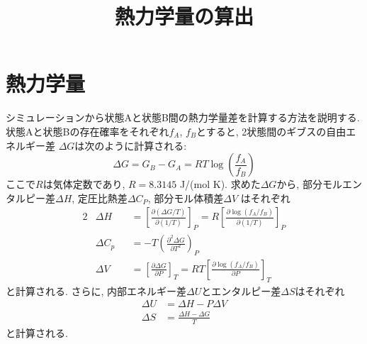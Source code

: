 





\title{熱力学量の算出}
\maketitle

\section{熱力学量}
シミュレーションから状態Aと状態B間の熱力学量差を計算する方法を説明する. 
状態Aと状態Bの存在確率をそれぞれ$f_{A}$, $f_{B}$とすると, 
2状態間のギブスの自由エネルギー差 $\Delta G$は次のように計算される:
\begin{equation}
    \Delta G = G_{B} - G_{A} =
    RT \log \left( \frac{f_{A}}{f_{B}} \right)
    \label{Eq:DeltaG}
\end{equation}
ここで$R$は気体定数であり, $R=8.3145$ J/(mol K). 
求めた$\Delta G$から, 
部分モルエンタルピー差$\Delta H$, 定圧比熱差$\Delta C_{P}$, 部分モル体積差$\Delta V$
はそれぞれ
\begin{alignat}{2}
    &\Delta H &&=
    \left[\frac{\partial \left(\Delta G / T\right)}{\partial \left( 1/T \right)}\right]_{P} =
    R \left[\frac{\partial \log (f_{A}/f_{B})} {\partial(1/T)} \right]_{P}
    \label{Eq:DeltaH} \\
    &\Delta C_{p} &&=
    - T \left(\frac{\partial^{2} \Delta G}{\partial T^{2}}\right)_{P}
    \label{Eq:DeltaCp} \\
    &\Delta V &&=
    \left[\frac{\partial \Delta G}{\partial P}\right]_{T} =
    RT \left[\frac{\partial \log (f_{A}/f_{B})}{\partial P} \right]_{T}
  \label{Eq:DeltaV}
\end{alignat}
と計算される. 
さらに, 内部エネルギー差$\Delta U$とエンタルピー差$\Delta S$はそれぞれ
\begin{align}
    \Delta U &= \Delta H - P \Delta V
    \label{Eq:DeltaU} \\
    \Delta S &= \frac{\Delta H - \Delta G}{T}
    \label{Eq:DeltaS}
\end{align}
と計算される. 

